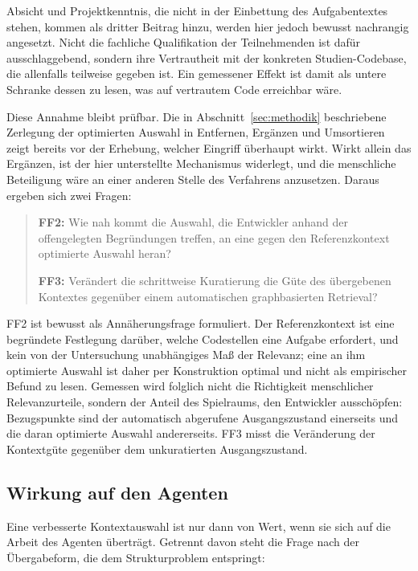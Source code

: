 Absicht und Projektkenntnis, die nicht in der Einbettung des Aufgabentextes stehen, kommen als dritter Beitrag hinzu, werden hier jedoch bewusst nachrangig angesetzt. Nicht die fachliche Qualifikation der Teilnehmenden ist dafür ausschlaggebend, sondern ihre Vertrautheit mit der konkreten Studien-Codebase, die allenfalls teilweise gegeben ist. Ein gemessener Effekt ist damit als untere Schranke dessen zu lesen, was auf vertrautem Code erreichbar wäre.

Diese Annahme bleibt prüfbar. Die in Abschnitt~\ref{sec:methodik} beschriebene Zerlegung der optimierten Auswahl in Entfernen, Ergänzen und Umsortieren zeigt bereits vor der Erhebung, welcher Eingriff überhaupt wirkt. Wirkt allein das Ergänzen, ist der hier unterstellte Mechanismus widerlegt, und die menschliche Beteiligung wäre an einer anderen Stelle des Verfahrens anzusetzen. Daraus ergeben sich zwei Fragen:

\begin{quote}
\textbf{FF2:} Wie nah kommt die Auswahl, die Entwickler anhand der offengelegten Begründungen treffen, an eine gegen den Referenzkontext optimierte Auswahl heran?

\textbf{FF3:} Verändert die schrittweise Kuratierung die Güte des übergebenen Kontextes gegenüber einem automatischen graphbasierten Retrieval?
\end{quote}

FF2 ist bewusst als Annäherungsfrage formuliert. Der Referenzkontext ist eine begründete Festlegung darüber, welche Codestellen eine Aufgabe erfordert, und kein von der Untersuchung unabhängiges Maß der Relevanz; eine an ihm optimierte Auswahl ist daher per Konstruktion optimal und nicht als empirischer Befund zu lesen. Gemessen wird folglich nicht die Richtigkeit menschlicher Relevanzurteile, sondern der Anteil des Spielraums, den Entwickler ausschöpfen: Bezugspunkte sind der automatisch abgerufene Ausgangszustand einerseits und die daran optimierte Auswahl andererseits. FF3 misst die Veränderung der Kontextgüte gegenüber dem unkuratierten Ausgangszustand.

\subsection{Wirkung auf den Agenten}

Eine verbesserte Kontextauswahl ist nur dann von Wert, wenn sie sich auf die Arbeit des Agenten überträgt. Getrennt davon steht die Frage nach der Übergabeform, die dem Strukturproblem entspringt:

